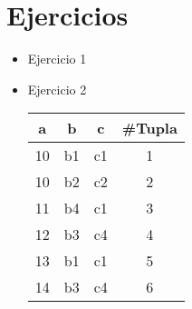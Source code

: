 \documentclass[a4paper,12pt]{article}
\begin{document}
\section{Ejercicios}
\begin{itemize}
    \item Ejercicio 1
    \item Ejercicio 2
    \begin{center}
        \begin{tabular}{|c|c|c|c|}          
            \hline  
            a  & b  & c  & \#Tupla \\ \hline
            10 & b1 & c1 & 1       \\
            10 & b2 & c2 & 2       \\
            11 & b4 & c1 & 3       \\
            12 & b3 & c4 & 4       \\
            13 & b1 & c1 & 5       \\
            14 & b3 & c4 & 6      \\ 
            \hline
            \end{tabular}
    \end{center}
\end{itemize}






\end{document}
